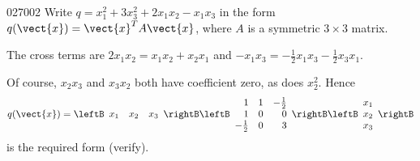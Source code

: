 \begin{example}{}{027002}
Write $q = x_1^2 + 3x_3^2+2x_1x_2 - x_1x_3$ in the form $q(\vect{x}) = \vect{x}^{T}A\vect{x}$, where $A$ is a symmetric $3 \times 3$ matrix.


\begin{solution}
  The cross terms are $2x_{1}x_{2} = x_{1}x_{2} + x_{2}x_{1}$ and $-x_{1}x_{3} = -\frac{1}{2}x_{1}x_{3} - \frac{1}{2}x_{3}x_{1}$.


Of course, $x_{2}x_{3}$ and $x_{3}x_{2}$ both have coefficient zero, as does $x^{2}_{2}$. Hence
\begin{equation*}
q(\vect{x}) = \leftB \begin{array}{rrr}
x_{1} & x_{2} & x_{3} 
\end{array}\rightB \leftB \begin{array}{rrr}
1 & 1 & -\frac{1}{2} \\
1 & 0 & 0 \\
-\frac{1}{2} & 0 & 3
\end{array}\rightB \leftB \begin{array}{c}
x_{1} \\
x_{2} \\
x_{3}
\end{array}\rightB
\end{equation*}
is the required form (verify).
\end{solution}
\end{example}

